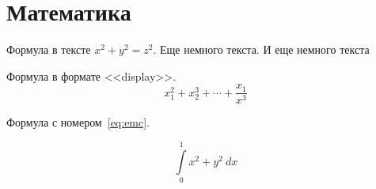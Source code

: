 \section{Математика}
Формула в тексте \(x^2+y^2=z^2\). Еще немного текста.
И еще немного текста

Формула в формате <<display>>.
\[x_1^2+x_2^3+\cdots+\frac{x_1}{x^3}\]

Формула с номером~\ref{eq:emc}.

\begin{equation}\label{eq:emc}
    \int\limits_0^1 x^2 + y^2 \ dx
\end{equation}
